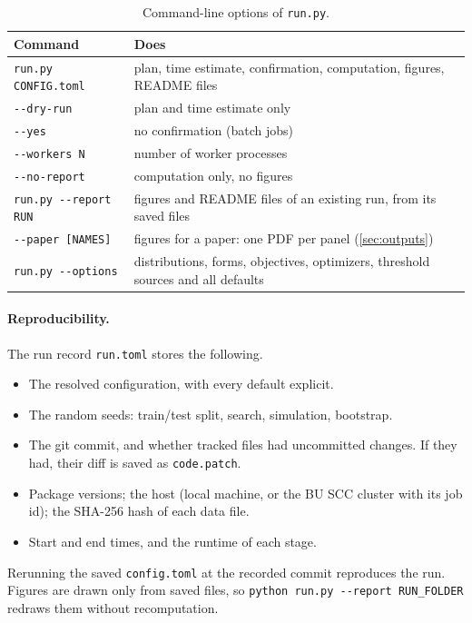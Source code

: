 \documentclass[11pt]{article}
\newcommand{\code}[1]{\texttt{#1}}
\begin{document}
\begin{table}[ht]
\centering\small
\begin{tabularx}{\linewidth}{@{}l L@{}}
\toprule
Command & Does \\
\midrule
\code{run.py CONFIG.toml} & plan, time estimate, confirmation, computation, figures, README files \\
\quad\code{-{}-dry-run} & plan and time estimate only \\
\quad\code{-{}-yes} & no confirmation (batch jobs) \\
\quad\code{-{}-workers N} & number of worker processes \\
\quad\code{-{}-no-report} & computation only, no figures \\
\code{run.py -{}-report RUN} & figures and README files of an existing run, from its saved files \\
\quad\code{-{}-paper [NAMES]} & figures for a paper: one PDF per panel (\cref{sec:outputs}) \\
\code{run.py -{}-options} & distributions, forms, objectives, optimizers, threshold sources and all defaults \\
\bottomrule
\end{tabularx}
\caption{Command-line options of \code{run.py}.}
\label{tab:cli}
\end{table}

\paragraph{Reproducibility.} The run record \code{run.toml} stores the following.
\begin{itemize}
    \item The resolved configuration, with every default explicit.
    \item The random seeds: train/test split, search, simulation, bootstrap.
    \item The git commit, and whether tracked files had uncommitted changes. If they had, their diff is saved as \code{code.patch}.
    \item Package versions; the host (local machine, or the BU SCC cluster with its job id); the SHA-256 hash of each data file.
    \item Start and end times, and the runtime of each stage.
\end{itemize}
Rerunning the saved \code{config.toml} at the recorded commit reproduces the run. Figures are drawn only from saved files, so \code{python run.py -{}-report RUN\_FOLDER} redraws them without recomputation.
\end{document}
